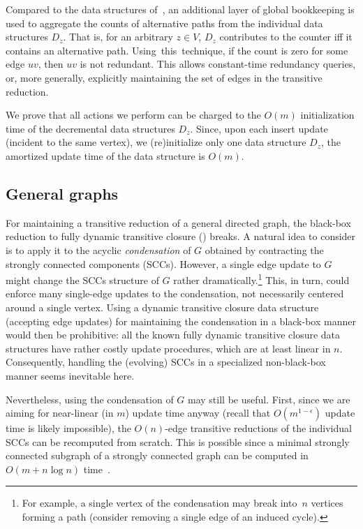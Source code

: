 \documentclass[11pt]{article}
\begin{document}
Compared to the data structures of~\cite{RodittyZ08, Roditty:2016aa},
an additional layer of global bookkeeping is used to aggregate the counts of alternative
paths from the individual data structures $D_z$.
That is, for an arbitrary \( z\in V \), \( D_z \) contributes to the counter iff it contains an alternative path. Using~this~technique,
 if the count is zero for some edge $uv$, then $uv$ is not redundant. This allows constant-time redundancy queries, or, more generally, explicitly maintaining the set of edges in the transitive reduction.

We prove that all actions we perform can be charged to the $O(m)$ initialization time of the decremental data structures $D_z$. 
Since, upon each insert update (incident to the same vertex), we (re)initialize only one data structure $D_z$, the amortized update time of the data structure is $O(m)$. 

\subsection{General graphs}
For maintaining a transitive reduction of a general directed graph, the black-box reduction to fully dynamic transitive closure () breaks. A natural idea to consider is to apply it to the acyclic \emph{condensation} of $G$ obtained by contracting the strongly connected components (SCCs).
However, a single edge update to $G$ might change the SCCs structure of $G$ rather dramatically.\footnote{For example, a single vertex of the condensation may break into~$n$ vertices forming a path (consider removing a single edge of an induced cycle).}
This, in turn, could enforce many single-edge updates to the condensation, not necessarily centered around a single vertex.
Using a dynamic transitive closure data structure (accepting edge updates) for maintaining the condensation in a black-box manner would then be prohibitive: all the known fully dynamic transitive closure data structures have rather costly update procedures, which are at least linear in $n$. 
Consequently, handling the (evolving) SCCs in a specialized non-black-box manner seems inevitable here.

Nevertheless, using the condensation of \( G \) may still be useful. First, since we are aiming for near-linear (in $m$) update time anyway (recall that $O(m^{1-\epsilon})$ update time is likely impossible), the  $O(n)$-edge transitive reductions of the individual SCCs can be recomputed from scratch. This is possible since a minimal strongly connected subgraph of a strongly connected graph can be computed in $O(m+n\log{n})$ time~\cite{GibbonsKRST91}.
\end{document}
